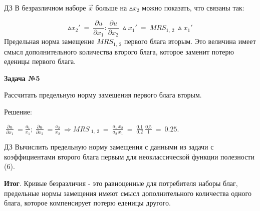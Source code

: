 \documentclass[12pt,a4paper]{article}
\begin{document}
	$\displaystyle \boxed{\text{ДЗ}}$ В безразличном наборе $\displaystyle \vec{x}$ больше на $\displaystyle \vartriangle x_{2}$ можно показать, что связаны так:


\begin{equation}
\vartriangle x_{2} '\ =\ \frac{\partial u}{\partial x_{1}} :\frac{\partial u}{\partial x_{2}} \ \vartriangle x_{1} '\ =\ MRS_{1,\ 2} \ \vartriangle x_{1} '
\end{equation}
Предельная норма замещение $\displaystyle MRS_{1,\ 2}$ первого блага вторым. Это величина имеет смысл дополнительного количества второго блага, которое заменит потерю еденицы первого блага.

\textbf{Задача №5}

Рассчитать предельную норму замещения первого блага вторым.

Решение:

$\displaystyle \ \frac{\partial u}{\partial x_{1}} \ =\frac{a_{1}}{x_{1}} ;\ \frac{\partial u}{\partial x_{2}} \ =\frac{a_{2}}{x_{2}} \ \Rightarrow MRS\ _{1,\ 2} \ =\ \frac{a_{1} \ x_{2}}{a_{2} \ x_{1}} \ =\ \frac{0.1}{0.2} \ \frac{0.5}{1} \ =\ 0.25$.

$\displaystyle \boxed{\text{ДЗ}}$ Вычислить предельную норму замещения с данными из задачи с коэффициентами второго блага первым для неоклассической функции полезности (6). 

\textbf{Итог}. Кривые безразличия - это равноценные для потребителя наборы благ, предельные нормы замещения имеют смысл дополнительного количества одного блага, которое компенсирует потерю еденицы другого.
\end{document}
